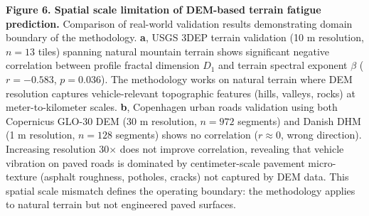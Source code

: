 \documentclass[11pt,letterpaper]{article}
\begin{document}
\textbf{Figure 6. Spatial scale limitation of DEM-based terrain fatigue prediction.} 
Comparison of real-world validation results demonstrating domain boundary of the methodology. 
\textbf{a}, USGS 3DEP terrain validation (10 m resolution, $n=13$ tiles) spanning natural mountain terrain shows significant negative correlation between profile fractal dimension $D_1$ and terrain spectral exponent $\beta$ ($r = -0.583$, $p = 0.036$). The methodology works on natural terrain where DEM resolution captures vehicle-relevant topographic features (hills, valleys, rocks) at meter-to-kilometer scales. 
\textbf{b}, Copenhagen urban roads validation using both Copernicus GLO-30 DEM (30 m resolution, $n=972$ segments) and Danish DHM (1 m resolution, $n=128$ segments) shows no correlation ($r \approx 0$, wrong direction). Increasing resolution 30$\times$ does not improve correlation, revealing that vehicle vibration on paved roads is dominated by centimeter-scale pavement micro-texture (asphalt roughness, potholes, cracks) not captured by DEM data. This spatial scale mismatch defines the operating boundary: the methodology applies to natural terrain but not engineered paved surfaces.
\end{document}
